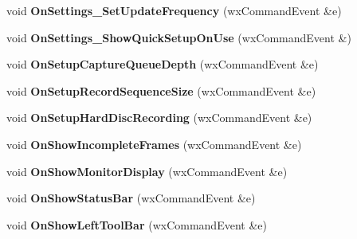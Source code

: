 \begin{DoxyCompactItemize}
\item 
\hypertarget{class_prop_view_frame_a109c0882203752ad90c9d4f70e9b5232}{void {\bfseries On\+Settings\+\_\+\+Set\+Update\+Frequency} (wx\+Command\+Event \&e)}\label{class_prop_view_frame_a109c0882203752ad90c9d4f70e9b5232}

\item 
\hypertarget{class_prop_view_frame_ab0edcb71ef4f18206348f2d99255b030}{void {\bfseries On\+Settings\+\_\+\+Show\+Quick\+Setup\+On\+Use} (wx\+Command\+Event \&)}\label{class_prop_view_frame_ab0edcb71ef4f18206348f2d99255b030}

\item 
\hypertarget{class_prop_view_frame_a69b848739097eb84045e81ba773c47f2}{void {\bfseries On\+Setup\+Capture\+Queue\+Depth} (wx\+Command\+Event \&e)}\label{class_prop_view_frame_a69b848739097eb84045e81ba773c47f2}

\item 
\hypertarget{class_prop_view_frame_a8a474749308efdf3cd6e9de4481f6970}{void {\bfseries On\+Setup\+Record\+Sequence\+Size} (wx\+Command\+Event \&e)}\label{class_prop_view_frame_a8a474749308efdf3cd6e9de4481f6970}

\item 
\hypertarget{class_prop_view_frame_ad93db0bba1efde221c07a8710a6b2824}{void {\bfseries On\+Setup\+Hard\+Disc\+Recording} (wx\+Command\+Event \&e)}\label{class_prop_view_frame_ad93db0bba1efde221c07a8710a6b2824}

\item 
\hypertarget{class_prop_view_frame_a9517486ae53a2f25b7c59550be2e0f2c}{void {\bfseries On\+Show\+Incomplete\+Frames} (wx\+Command\+Event \&e)}\label{class_prop_view_frame_a9517486ae53a2f25b7c59550be2e0f2c}

\item 
\hypertarget{class_prop_view_frame_a782ce63c102140c44161d3f61cb0f926}{void {\bfseries On\+Show\+Monitor\+Display} (wx\+Command\+Event \&e)}\label{class_prop_view_frame_a782ce63c102140c44161d3f61cb0f926}

\item 
\hypertarget{class_prop_view_frame_aee594a8d3d5b06c7a475876ea52a03e0}{void {\bfseries On\+Show\+Status\+Bar} (wx\+Command\+Event \&e)}\label{class_prop_view_frame_aee594a8d3d5b06c7a475876ea52a03e0}

\item 
\hypertarget{class_prop_view_frame_a4075372d288ca9424807ba7fa1335068}{void {\bfseries On\+Show\+Left\+Tool\+Bar} (wx\+Command\+Event \&e)}\label{class_prop_view_frame_a4075372d288ca9424807ba7fa1335068}


\end{DoxyCompactItemize}

